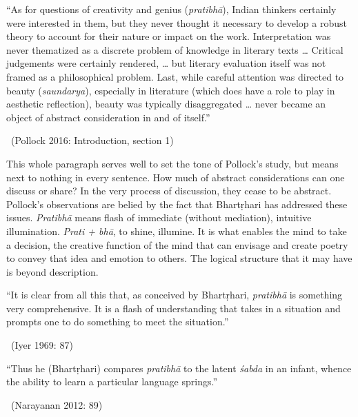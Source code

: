 \begin{myquote}
“As for questions of creativity and genius (\textit{pratibhā}), Indian thinkers certainly were interested in them, but they never thought it necessary to develop a robust theory to account for their nature or impact on the work. Interpretation was never thematized as a discrete problem of knowledge in literary texts … Critical judgements were certainly rendered, … but literary evaluation itself was not framed as a philosophical problem. Last, while careful attention was directed to beauty (\textit{saundarya}), especially in literature (which does have a role to play in aesthetic reflection), beauty was typically disaggregated … never became an object of abstract consideration in and of itself.” 

~\hfill (Pollock 2016: Introduction, section 1)
\end{myquote}

This whole paragraph serves well to set the tone of Pollock’s study, but means next to nothing in every sentence. How much of abstract considerations can one discuss or share? In the very process of discussion, they cease to be abstract. Pollock’s observations are belied by the fact that Bhartṛhari has addressed these issues. \textit{Pratibhā} means flash of immediate (without mediation), intuitive illumination. \textit{Prati + bhā}, to shine, illumine. It is what enables the mind to take a decision, the creative function of the mind that can envisage and create poetry to convey that idea and emotion to others. The logical structure that it may have is beyond description.

\begin{myquote}
“It is clear from all this that, as conceived by Bhartṛhari, \textit{pratibhā }is something very comprehensive. It is a flash of understanding that takes in a situation and prompts one to do something to meet the situation.” 

~\hfill (Iyer 1969: 87)
\end{myquote}

\begin{myquote}
“Thus he (Bhartṛhari) compares \textit{pratibhā} to the latent \textit{śabda} in an infant, whence the ability to learn a particular language springs.” 

~\hfill (Narayanan 2012: 89)
\end{myquote}

